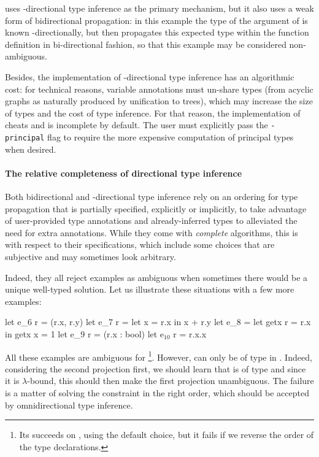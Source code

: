 \documentclass[acmsmall,screen,nonacm,review]{acmart}
\begin{document}
\OCaml uses \geninst-directional type inference as the
primary mechanism, but it also uses a weak form of bidirectional propagation: in this example the type of the argument of  is known \Geninst-directionally, but \OCaml then propagates this expected type within the function definition in bi-directional fashion, so that this example may be considered non-ambiguous.

Besides, the implementation of \geninst-directional type inference has an
algorithmic cost: for technical reasons, variable annotations must un-share
types (from acyclic graphs as naturally produced by unification to trees),
which may increase the size of types and the cost of type inference. For
that reason, the implementation of \OCaml cheats and is incomplete by
default. The user must explicitly pass the \texttt{-principal} flag to
require the more expensive computation of principal types when desired.

\paragraph{The relative completeness of directional type inference}

Both bidirectional and \geninst-directional type inference rely on an
ordering for type propagation that is partially specified, explicitly or
implicitly, to take advantage of user-provided type annotations and
already-inferred types to alleviated the need for extra annotations.
%
While they come with \emph{complete} algorithms, this is with respect to
their specifications, which include some choices that are subjective and may
sometimes look arbitrary.

\locallabelreset

Indeed, they all reject examples as ambiguous when sometimes there
would be a unique well-typed solution.
%
Let us illustrate these situations with a few more examples:
\begin{program}[error]
let e_6 r = (r.x, r.y)
let e_7 r = let x = r.x in x + r.y
let e_8 = let getx r = r.x in getx {x = 1}
let e_9 r = (r.x : bool)
let e$_{10}$ r = r.x.x
\end{program}
All these examples are ambiguous for \OCaml\footnote{Its succeeds on ,
using the default choice, but it fails if we reverse the order of the type
declarations.}.  However,  can only be of type
 in . Indeed, considering the second projection first,
we should learn that  is of type  and since it is
$\lambda$-bound, this should then make the first projection unambiguous.
The failure is a matter of solving the constraint in the right order, which
should be accepted by omnidirectional type inference.
\end{document}
